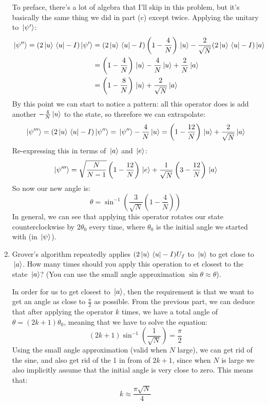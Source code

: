 \documentclass[10pt]{article}
\begin{document}
\begin{enumerate}[label=\alph*)]
			\begin{solution}
				To preface, there's a lot of algebra that I'll skip in this problem, but it's basically the same thing 
				we did in part (c) except twice. Applying the unitary to \( \ket*{\psi'} \):
				\begin{align*}
					\ket*{\psi''} = (2\ket*{u}\bra*{u} - I) \ket*{\psi'} &= 
					(2 \ket*{u}\bra*{u} - I) \left( 1 - \frac{4}{N} \right) 
					\ket*{u} - \frac{2}{\sqrt{N} }(2 \ket*{u}\bra*{u} - I) \ket*{a}\\
					&= \left( 1 - \frac{4}{N} \right) \ket*{u} - \frac{4}{N}\ket*{u} + \frac{2}{N}\ket*{a}\\
					&= \left( 1- \frac{8}{N} \right) \ket*{u} + \frac{2}{\sqrt{N}}\ket*{a} 
				\end{align*} 
				By this point we can start to notice a pattern: all this operator does is add another \( -\frac{4}{N}
				\ket*{u}\) to the state, so therefore we can extrapolate:
				\[
				\ket*{\psi'''} = (2\ket*{u}\bra*{u} - I) \ket*{\psi''} = \ket*{\psi''} - \frac{4}{N}\ket*{u}
				= \left( 1 - \frac{12}{N} \right) \ket*{u} + \frac{2}{\sqrt{N} }\ket*{a}
				\] 
				Re-expressing this in terms of \( \ket*{a} \) and \( \ket*{e} \):
				\[
				\ket*{\psi'''} = \sqrt{\frac{N}{N-1}} \left( 1 - \frac{12}{N} \right) \ket*{e} + \frac{1}{\sqrt{N} }
				\left(3 - \frac{12}{N}\right)\ket*{a}
				\] 
				So now our new angle is:
				\[
				\theta = \sin^{-1}\left( \frac{3}{\sqrt{N} }\left( 1 - \frac{4}{N} \right)  \right) 
				\] 
				In general, we can see that applying this operator rotates our state counterclockwise by \( 2\theta_0 \)
				every time, where \( \theta_0 \) is the initial angle we started with (in \( \ket*{\psi} \)). 
			\end{solution}
		\item Grover's algorithm repeatedly applies \( (2 \ket*{u} \bra*{u} - I) U_f \) to \( \ket*{u} \) to get 
			close to \( \ket*{a} \). How many times should you apply this operation to et 
			closest to the state \( \ket*{a} \)? (You can use the small angle approximation
			\( \sin \theta \approx \theta \)).

			\begin{solution}
				In order for us to get closest to \( \ket*{a} \), then the requirement is that we want to get 
				an angle as close to \( \frac{\pi}{2} \) as possible. From the previous part, we can deduce that
				after applying the operator \( k \) times, we have a total angle of \( \theta = (2k + 1)\theta_0 \), 
				meaning that we have to solve the equation:
				\[
					(2k+1)\sin^{-1}\left( \frac{1}{\sqrt{N} } \right)  = \frac{\pi}{2}
				\] 
				Using the small angle approximation (valid when \( N \) large), we can get rid of the sine, and 
				also get rid of the 1 in from of \( 2k + 1 \), since when \( N \) is large we also implicitly assume 
				that the initial angle is very close to zero. This means that:
				\[
				k \approx \frac{\pi \sqrt{N} }{4}
				\] 
			\end{solution}
	\end{enumerate}
\end{document}
